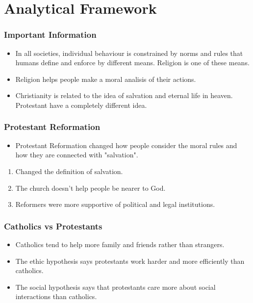 \documentclass[pdftex,12pt,xcolor=pdftex,table]{beamer}
\begin{document}
\section{Analytical Framework}
\begin{frame}
\frametitle{Important Information}
\begin{itemize}
\item In all societies, individual behaviour is constrained by norms and rules that humans define
and enforce by different means. Religion is one of these means.
\item Religion helps people make a moral analisis of their actions.
\item Christianity is related to the idea of salvation and eternal life in heaven. Protestant have a completely different idea. 
\end{itemize}
\end{frame}
\begin{frame}
\frametitle{Protestant Reformation}
\begin{itemize}
\item Protestant Reformation changed how people consider the moral rules and how they are connected with "salvation".
\end{itemize}
\begin{enumerate}
\item Changed the definition of salvation.
\item The church doesn't help people be nearer to God. 
\item Reformers were more supportive of political and legal institutions.
\end{enumerate}
\end{frame}
\begin{frame}
\frametitle{Catholics vs Protestants}
\begin{itemize}
\item Catholics tend to help more family and friends rather than strangers. 
\item The ethic hypothesis says protestants work harder and more efficiently than catholics. 
\item The social hypothesis says that protestants care more about social interactions than catholics. 
 \end{itemize}
\end{frame}
\end{document}
